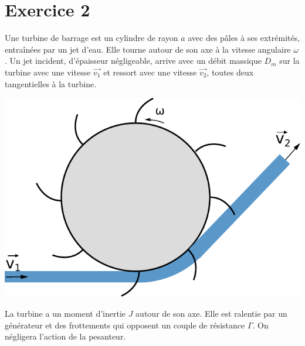 \documentclass{report}
\begin{document}
\newpage

\section*{Exercice 2}

Une turbine de barrage est un cylindre de rayon $a$ avec des pâles à ses extrémités, entraînées par un jet d'eau. Elle tourne autour de son axe à la vitesse angulaire $\omega$. Un jet incident, d'épaisseur négligeable, arrive avec un débit massique $D_m$ sur la turbine avec une vitesse $\vec{v_1}$ et ressort avec une vitesse $\vec{v_2}$, toutes deux tangentielles à la turbine.

\begin{center}
	\includegraphics[scale=0.5]{meca_flu7.pdf}
\end{center}

La turbine a un moment d'inertie $J$ autour de son axe. Elle est ralentie par un générateur et des frottements qui opposent un couple de résistance $\Gamma$. On négligera l'action de la pesanteur.
\end{document}
